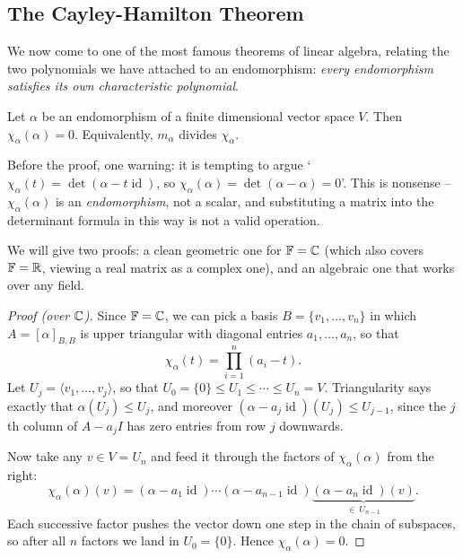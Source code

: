 \documentclass[a4paper]{scrartcl}
\begin{document}
\subsection{The Cayley-Hamilton Theorem}

We now come to one of the most famous theorems of linear algebra, relating the two polynomials we have attached to an endomorphism: \emph{every endomorphism satisfies its own characteristic polynomial}.

\begin{theorem}
    Let $\alpha$ be an endomorphism of a finite dimensional vector space $V$. Then $\chi_\alpha(\alpha) = 0$. Equivalently, $m_\alpha$ divides $\chi_\alpha$.
\end{theorem}

Before the proof, one warning: it is tempting to argue `$\chi_\alpha(t) = \det (\alpha - t\operatorname{id})$, so $\chi_\alpha(\alpha) = \det(\alpha - \alpha) = 0$'. This is nonsense -- $\chi_\alpha(\alpha)$ is an \emph{endomorphism}, not a scalar, and substituting a matrix into the determinant formula in this way is not a valid operation.

We will give two proofs: a clean geometric one for $\mathbb{F} = \mathbb{C}$ (which also covers $\mathbb{F} = \mathbb{R}$, viewing a real matrix as a complex one), and an algebraic one that works over any field.

\begin{proof}[Proof (over $\mathbb{C}$)]
    Since $\mathbb{F} = \mathbb{C}$, we can pick a basis $B = \{v_1, \dots, v_n\}$ in which $A = [\alpha]_{B,B}$ is upper triangular with diagonal entries $a_1, \dots, a_n$, so that
    $$
    \chi_\alpha(t) = \prod_{i = 1}^n (a_i - t).
    $$
    Let $U_j = \langle v_1, \dots, v_j\rangle$, so that $U_0 = \{0\} \leq U_1 \leq \cdots \leq U_n = V$. Triangularity says exactly that $\alpha(U_j) \leq U_j$, and moreover $(\alpha - a_j \operatorname{id})(U_j) \leq U_{j - 1}$, since the $j$th column of $A - a_j I$ has zero entries from row $j$ downwards.

    Now take any $v \in V = U_n$ and feed it through the factors of $\chi_\alpha(\alpha)$ from the right:
    $$
    \chi_\alpha(\alpha)(v) = (\alpha - a_1 \operatorname{id}) \cdots (\alpha - a_{n-1}\operatorname{id}) \underbrace{(\alpha - a_n \operatorname{id})(v)}_{\in\, U_{n - 1}}.
    $$
    Each successive factor pushes the vector down one step in the chain of subspaces, so after all $n$ factors we land in $U_0 = \{0\}$. Hence $\chi_\alpha(\alpha) = 0$.
\end{proof}
\end{document}
